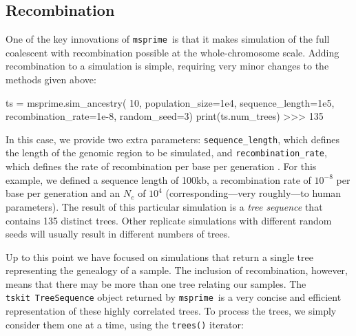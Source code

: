 \documentclass[graybox]{svmult}
\newcommand{\msprime}[0]{\texttt{msprime}}
\newcommand{\tskit}[0]{\texttt{tskit}}
\begin{document}


\subsection{Recombination}\label{recombination}

One of the key innovations of \msprime\ is that it makes simulation of the
full coalescent with recombination possible at the whole-chromosome scale.
Adding recombination to a simulation is simple, requiring very minor
changes to the methods given above:

\begin{pythoncode}
ts = msprime.sim_ancestry(
    10, population_size=1e4, sequence_length=1e5,
    recombination_rate=1e-8, random_seed=3)
print(ts.num_trees)
>>> 135
\end{pythoncode}

In this case, we provide two extra parameters: \texttt{sequence\_length}, which
defines the length of the genomic region to be simulated, and
\texttt{recombination\_rate}, which defines the rate of recombination
per base per generation .
For this example, we defined a sequence length of 100kb, a recombination rate of
\(10^{-8}\) per base per generation and an $N_e$ of $10^4$ 
(corresponding---very roughly---to human parameters).
The result of this particular simulation is a
\emph{tree sequence} that contains 135 distinct trees. Other replicate
simulations with different random seeds will usually result in different
numbers of trees.

Up to this point we have focused on simulations that return a single
tree representing the genealogy of a sample. The inclusion of
recombination, however, means that there may be more than one tree
relating our samples. The \tskit\ \texttt{TreeSequence} object returned by
\msprime\ is a very concise and efficient representation of these highly
correlated trees. To process the trees, we simply consider
them one at a time, using the \texttt{trees()} iterator:
\end{document}
